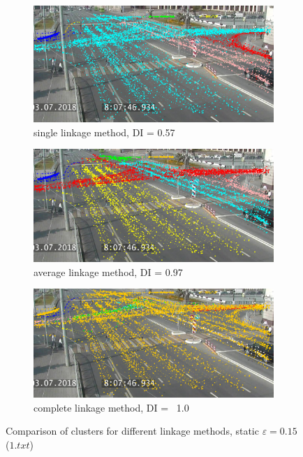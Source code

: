 \begin{figure}[!htb]
	\centering
	\begin{subfigure}[!htb]{0.3\textwidth}
		\centering{}
		\includegraphics[width=\textwidth]{images/link_meth_comp_adapt_min.png}
		\caption{single linkage method, DI = 0.57}
		\label{fig:link-meth-comp-adapt-min}
	\end{subfigure}
	\hfill
	\begin{subfigure}[!htb]{0.3\textwidth}
		\centering{}
		\includegraphics[width=\textwidth]{images/link_meth_comp_adapt_avg.png}
		\caption{average linkage method, DI = 0.97}
		\label{fig:link-meth-comp-adapt-avg}
	\end{subfigure}
	\hfill
	\begin{subfigure}[!htb]{0.3\textwidth}
		\centering{}
		\includegraphics[width=\textwidth]{images/link_meth_comp_adapt_max.png}
		\caption{complete linkage method, DI = ~1.0}
		\label{fig:link-meth-comp-adapt-max}
	\end{subfigure}
	\caption{Comparison of clusters for different linkage methods, static $\varepsilon = 0.15$ ($1.txt$)}
	\label{fig:link-meth-comp-adapt}
\end{figure}

